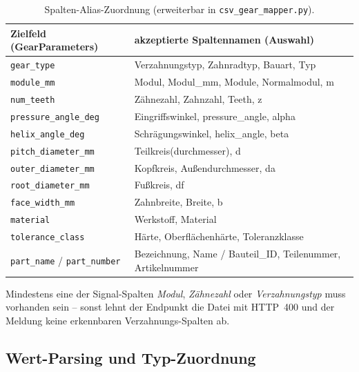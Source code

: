 \documentclass[12pt, a4paper]{article}
\begin{document}
\begin{table}[H]
\centering
\small
\begin{tabularx}{\textwidth}{@{}l X@{}}
\toprule
\textbf{Zielfeld (GearParameters)} & \textbf{akzeptierte Spaltennamen (Auswahl)} \\
\midrule
\texttt{gear\_type}            & Verzahnungstyp, Zahnradtyp, Bauart, Typ \\
\texttt{module\_mm}            & Modul, Modul\_mm, Module, Normalmodul, m \\
\texttt{num\_teeth}            & Zähnezahl, Zahnzahl, Teeth, z \\
\texttt{pressure\_angle\_deg}  & Eingriffswinkel, pressure\_angle, alpha \\
\texttt{helix\_angle\_deg}     & Schrägungswinkel, helix\_angle, beta \\
\texttt{pitch\_diameter\_mm}   & Teilkreis(durchmesser), d \\
\texttt{outer\_diameter\_mm}   & Kopfkreis, Außendurchmesser, da \\
\texttt{root\_diameter\_mm}    & Fußkreis, df \\
\texttt{face\_width\_mm}       & Zahnbreite, Breite, b \\
\texttt{material}              & Werkstoff, Material \\
\texttt{tolerance\_class}      & Härte, Oberflächenhärte, Toleranzklasse \\
\texttt{part\_name} / \texttt{part\_number} & Bezeichnung, Name / Bauteil\_ID, Teilenummer, Artikelnummer \\
\bottomrule
\end{tabularx}
\caption{Spalten-Alias-Zuordnung (erweiterbar in \texttt{csv\_gear\_mapper.py}).}
\end{table}

Mindestens eine der Signal-Spalten \emph{Modul}, \emph{Zähnezahl} oder
\emph{Verzahnungstyp} muss vorhanden sein -- sonst lehnt der Endpunkt die Datei
mit HTTP~400 und der Meldung \glqq keine erkennbaren Verzahnungs-Spalten\grqq{} ab.

\subsection{Wert-Parsing und Typ-Zuordnung}
\end{document}
